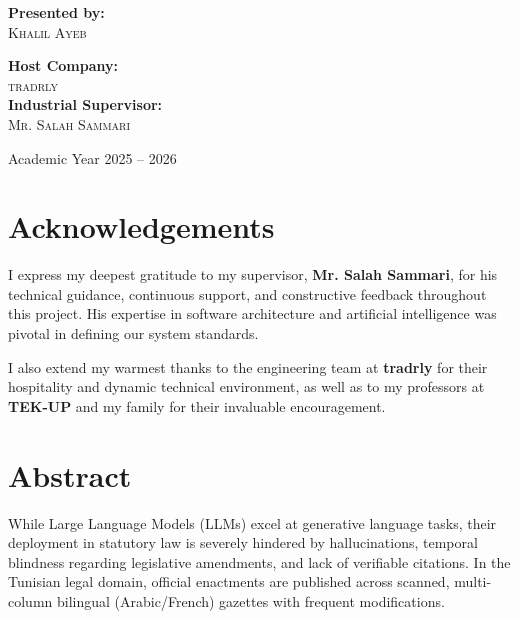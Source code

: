 \documentclass[12pt,a4paper]{report}
\begin{document}
\begin{titlepage}
    \vspace{1.8cm}
    \begin{minipage}{0.45\textwidth}
        \begin{flushleft} \large
            \textbf{Presented by:}\\
            \textsc{Khalil Ayeb}
        \end{flushleft}
    \end{minipage}
    \hfill
    \begin{minipage}{0.45\textwidth}
        \begin{flushright} \large
            \textbf{Host Company:}\\
            \textsc{tradrly}\\
            \vspace{0.3cm}
            \textbf{Industrial Supervisor:}\\
            \textsc{Mr. Salah Sammari}
        \end{flushright}
    \end{minipage}
    
    \vfill
    {\large Academic Year 2025 -- 2026\par}
\end{titlepage}


\chapter*{Acknowledgements}
I express my deepest gratitude to my supervisor, \textbf{Mr. Salah Sammari}, for his technical guidance, continuous support, and constructive feedback throughout this project. His expertise in software architecture and artificial intelligence was pivotal in defining our system standards.

I also extend my warmest thanks to the engineering team at \textbf{tradrly} for their hospitality and dynamic technical environment, as well as to my professors at \textbf{TEK-UP} and my family for their invaluable encouragement.

\chapter*{Abstract}
While Large Language Models (LLMs) excel at generative language tasks, their deployment in statutory law is severely hindered by hallucinations, temporal blindness regarding legislative amendments, and lack of verifiable citations. In the Tunisian legal domain, official enactments are published across scanned, multi-column bilingual (Arabic/French) gazettes with frequent modifications.
\end{document}
